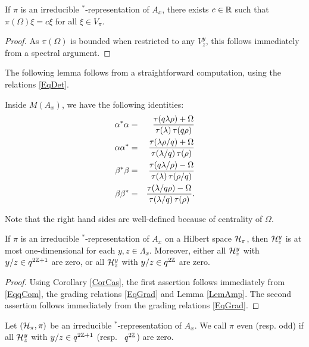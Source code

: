 \begin{Cor}\label{CorCas} If $\pi$ is an irreducible $^*$-representation of $A_x$, there exists $c\in \mathbb{R}$ such that $\pi(\Omega)\xi = c\xi$ for all $\xi \in V_{\pi}$. 
\end{Cor} 
\begin{proof} As $\pi(\Omega)$ is bounded when restricted to any $V^y_z$, this follows immediately from a spectral argument. 
\end{proof} 

The following lemma follows from a straightforward computation, using the relations \eqref{EqDet}.

\begin{Lem}\label{LemAmp} Inside $M(A_x)$, we have the following identities:
\begin{eqnarray*}
\alpha^*\alpha &=& \frac{\operatorname{\tau}(q\lambda\rho)+\Omega}{\operatorname{\tau}(\lambda)\operatorname{\tau}(q\rho)}\\
\alpha\alpha^* &=& \frac{\operatorname{\tau}(\lambda\rho/q)+\Omega}{\operatorname{\tau}(\lambda/q)\operatorname{\tau}(\rho)}\\ 
\beta^*\beta &=& \frac{\operatorname{\tau}(q\lambda/\rho)-\Omega}{\operatorname{\tau}(\lambda)\operatorname{\tau}(\rho/q)}\\
\beta\beta^* &=&  \frac{\operatorname{\tau}(\lambda/q\rho)-\Omega}{\operatorname{\tau}(\lambda/q)\operatorname{\tau}(\rho)}.
\end{eqnarray*}
\end{Lem}

Note that the right hand sides are well-defined because of centrality of $\Omega$.

\begin{Cor}\label{CorOneDim} If $\pi$ is an irreducible $^*$-representation of $A_x$ on a Hilbert space $\mathcal{H}_{\pi}$, then $\mathcal{H}^y_z$ is at most one-dimensional for each $y,z\in \Lambda_x$. Moreover, either all $\mathcal{H}^y_z$ with $y/z\in q^{2\mathbb{Z}+1}$ are zero, or all $\mathcal{H}^y_z$ with $y/z\in q^{2\mathbb{Z}}$ are zero. 
\end{Cor} 
\begin{proof} 
Using Corollary \ref{CorCas}, the first assertion follows immediately from \eqref{EqqCom}, the grading relations \eqref{EqGrad} and Lemma \ref{LemAmp}. The second assertion follows immediately from the grading relations \eqref{EqGrad}.
\end{proof}

\begin{Def} Let $(\mathcal{H}_{\pi},\pi)$ be an irreducible $^*$-representation of $A_x$. We call $\pi$ even (resp. odd) if all $\mathcal{H}^y_z$ with $y/z \in q^{2\mathbb{Z}+1}$ (resp.~ $q^{2\mathbb{Z}}$) are zero.
\end{Def} 

